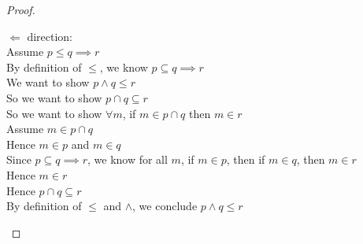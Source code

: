 \begin{proof}
\begin{enumerate}
\begin{tabbedproof}
    $\Leftarrow$ direction:\\
    \oo Assume $p \leq q \implies r$ \\
    \ooo By definition of $\leq$, we know $p \subseteq q \implies r$ \\
    \ooo We want to show $p \land q \leq r$ \\
    \ooo So we want to show $p \cap q \subseteq r$ \\
    \ooo So we want to show $\forall m$, if $m \in p \cap q$ then $m \in r$ \\
    \ooo Assume $m \in p \cap q$ \\
    \oooo Hence $m \in p$ and $m \in q$ \\
    \oooo Since $p \subseteq q \implies r$, we know for all $m$, if $m \in p$, then if $m \in q$, then $m \in r$ \\
    \oooo Hence $m \in r$ \\
    \ooo Hence $p \cap q \subseteq r$ \\
    \ooo By definition of $\leq$ and $\land$, we conclude $p \land q \leq r$ \\
  \end{tabbedproof}


\end{enumerate}
\end{proof}
